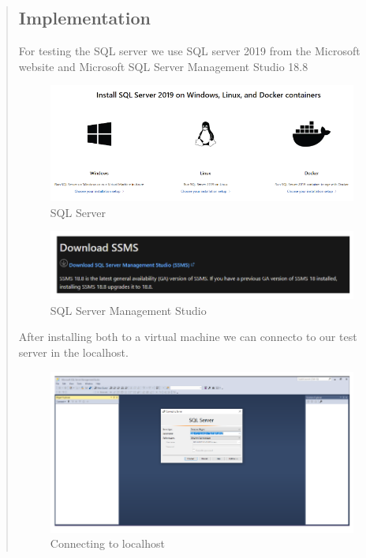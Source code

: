\documentclass{article}
\begin{document}
\begin{quote}
  \subsection{Implementation}
    For testing the SQL server we use SQL server 2019 from the Microsoft website and Microsoft SQL Server Management Studio 18.8
    \begin{figure}[h!]
        \centering
        \includegraphics[width=1.2\columnwidth]{Images/sqlServer.png}
        \caption{SQL Server}
        \label{fig:figure 8}
    \end{figure}

    \begin{figure}[h!]
        \centering
        \includegraphics[width=1.2\columnwidth]{Images/ssms.png}
        \caption{SQL Server Management Studio}
        \label{fig:figure 9}
    \end{figure}

    After installing both to a virtual machine we can connecto to our test server in the localhost.

    \begin{figure}[h!]
        \centering
        \includegraphics[scale=0.5]{Images/connectingLocalhost.png}
        \caption{Connecting to localhost}
        \label{fig:figure 10}
    \end{figure}


\end{quote}
\end{document}
